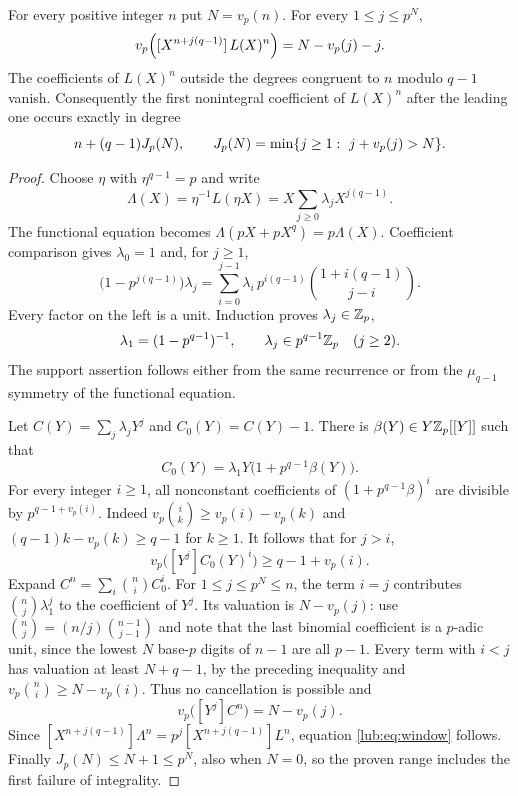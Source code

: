\begin{theorem}\label{lub:thm:window}
For every positive integer $n$ put $N=v_p(n)$. For every $1\le j\le p^N$,
\begin{equation}\label{lub:eq:window}
 v_p\Bigl([X^{n+j(q-1)}]\,L(X)^n\Bigr)=N-v_p(j)-j .
\end{equation}
The coefficients of $L(X)^n$ outside the degrees congruent to $n$ modulo $q-1$ vanish.
Consequently the first nonintegral coefficient of $L(X)^n$ after the leading one occurs
exactly in degree
\[
 n+(q-1)J_p(N),\qquad J_p(N)=\min\set{j\ge1:\ j+v_p(j)>N}.
\]
\end{theorem}
\begin{proof}
Choose $\eta$ with $\eta^{q-1}=p$ and write
\[
 \Lambda(X)=\eta^{-1}L(\eta X)=X\sum_{j\ge0}\lambda_jX^{j(q-1)} .
\]
The functional equation becomes $\Lambda(pX+pX^q)=p\Lambda(X)$. Coefficient comparison
gives $\lambda_0=1$ and, for $j\ge1$,
\[
 \bigl(1-p^{j(q-1)}\bigr)\lambda_j=\sum_{i=0}^{j-1}\lambda_i\,p^{i(q-1)}\binom{1+i(q-1)}{j-i}.
\]
Every factor on the left is a unit. Induction proves $\lambda_j\in\mathbb{Z}_p$,
\[
 \lambda_1=(1-p^{q-1})^{-1},\qquad \lambda_j\in p^{q-1}\mathbb{Z}_p\quad(j\ge2).
\]
The support assertion follows either from the same recurrence or from the $\mu_{q-1}$
symmetry of the functional equation.

Let $C(Y)=\sum_j\lambda_jY^j$ and $C_0(Y)=C(Y)-1$. There is $\beta(Y)\in Y\mathbb{Z}_p[[Y]]$ such
that
\[
 C_0(Y)=\lambda_1Y\bigl(1+p^{q-1}\beta(Y)\bigr).
\]
For every integer $i\ge1$, all nonconstant coefficients of $(1+p^{q-1}\beta)^i$ are
divisible by $p^{q-1+v_p(i)}$. Indeed $v_p\binom ik\ge v_p(i)-v_p(k)$ and
$(q-1)k-v_p(k)\ge q-1$ for $k\ge1$. It follows that for $j>i$,
\[
 v_p\bigl([Y^j]C_0(Y)^i\bigr)\ge q-1+v_p(i).
\]
Expand $C^n=\sum_i\binom niC_0^i$. For $1\le j\le p^N\le n$, the term $i=j$ contributes
$\binom nj\lambda_1^j$ to the coefficient of $Y^j$. Its valuation is $N-v_p(j)$: use
$\binom nj=(n/j)\binom{n-1}{j-1}$ and note that the last binomial coefficient is a $p$-adic
unit, since the lowest $N$ base-$p$ digits of $n-1$ are all $p-1$. Every term with $i<j$
has valuation at least $N+q-1$, by the preceding inequality and
$v_p\binom ni\ge N-v_p(i)$. Thus no cancellation is possible and
\[
 v_p\bigl([Y^j]C^n\bigr)=N-v_p(j).
\]
Since $[X^{n+j(q-1)}]\Lambda^n=p^j[X^{n+j(q-1)}]L^n$, equation \eqref{lub:eq:window}
follows. Finally $J_p(N)\le N+1\le p^N$, also when $N=0$, so the proven range includes the
first failure of integrality.
\end{proof}

